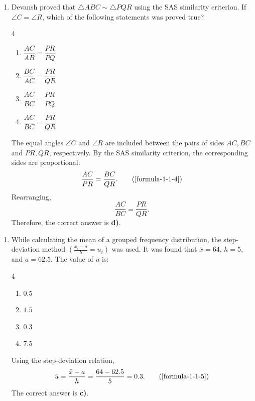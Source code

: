 \begin{enumerate}[label={},font=\normalfont,leftmargin=1.15cm,labelwidth=1.0cm,labelsep=0.15cm,itemindent=0pt,listparindent=0pt,parsep=0pt,topsep=0pt]
\item[5.1.5] Devansh proved that $\triangle ABC \sim \triangle PQR$ using the SAS similarity criterion. If $\angle C = \angle R$, which of the following statements was proved true?

\begin{multicols}{4}
\begin{enumerate}
\setlength{\itemsep}{0pt}
    \item $\dfrac{AC}{AB} = \dfrac{PR}{PQ}$
    \item $\dfrac{BC}{AC} = \dfrac{PR}{QR}$
    \item $\dfrac{AC}{BC} = \dfrac{PR}{PQ}$
    \item $\dfrac{AC}{BC} = \dfrac{PR}{QR}$
\end{enumerate}
\end{multicols}

\vspace{0.7em}\par\solution


The equal angles $\angle C$ and $\angle R$ are included between the pairs of sides $AC, BC$ and $PR, QR$, respectively. By the SAS similarity criterion, the corresponding sides are proportional:
\begin{equation*}
\frac{AC}{PR} = \frac{BC}{QR}.
\tag*{(\ref{formula-1-1-4})}\end{equation*}
Rearranging,
\[
\frac{AC}{BC} = \frac{PR}{QR}.
\]
Therefore, the correct answer is \textbf{d)}.


\end{enumerate}
\vspace{1.2em}
\begin{enumerate}[label={},font=\normalfont,leftmargin=1.15cm,labelwidth=1.0cm,labelsep=0.15cm,itemindent=0pt,listparindent=0pt,parsep=0pt,topsep=0pt]
\item[5.1.6] While calculating the mean of a grouped frequency distribution, the step-deviation method $\left(\frac{x_i-a}{h}=u_i\right)$ was used. It was found that $\bar{x}=64$, $h=5$, and $a=62.5$. The value of $\bar{u}$ is:

\begin{multicols}{4}
\begin{enumerate}
\setlength{\itemsep}{0pt}
    \item $0.5$
    \item $1.5$
    \item $0.3$
    \item $7.5$
\end{enumerate}
\end{multicols}

\vspace{0.7em}\par\solution


Using the step-deviation relation,
\begin{equation*}
\bar{u}=\frac{\bar{x}-a}{h}=\frac{64-62.5}{5}=0.3.
\tag*{(\ref{formula-1-1-5})}\end{equation*}
The correct answer is \textbf{c)}.

\end{enumerate}
